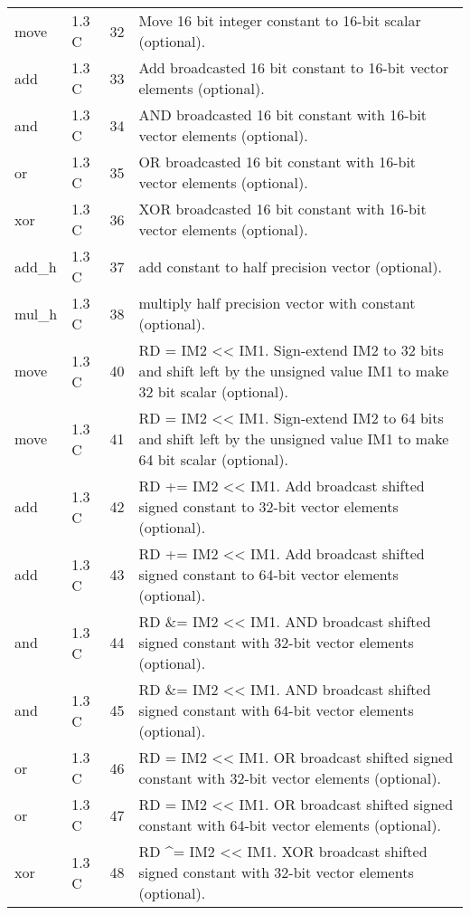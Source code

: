 \documentclass[forwardcom.tex]{subfiles}
\begin{document}
\begin{longtable} {|p{25mm}|p{12mm}|p{12mm}|p{95mm}|}
move          & 1.3 C & 32 & Move 16 bit integer constant to 16-bit scalar (optional). \\
add           & 1.3 C & 33 & Add broadcasted 16 bit constant to 16-bit vector elements (optional). \\
and           & 1.3 C & 34 & AND broadcasted 16 bit constant with 16-bit vector elements (optional). \\
or            & 1.3 C & 35 & OR broadcasted 16 bit constant with 16-bit vector elements (optional). \\
xor           & 1.3 C & 36 & XOR broadcasted 16 bit constant with 16-bit vector elements (optional). \\
add\_h        & 1.3 C & 37 & add constant to half precision vector (optional). \\
mul\_h        & 1.3 C & 38 & multiply half precision vector with constant (optional). \\
move          & 1.3 C & 40 & RD = IM2 \textless\textless{} IM1. Sign-extend IM2 to 32 bits and shift left by the unsigned value IM1 to make 32 bit scalar (optional). \\
move          & 1.3 C & 41 & RD = IM2 \textless\textless{} IM1. Sign-extend IM2 to 64 bits and shift left by the unsigned value IM1 to make 64 bit scalar (optional). \\
add           & 1.3 C & 42 & RD += IM2 \textless\textless{} IM1. Add broadcast shifted signed constant to 32-bit vector elements (optional). \\
add           & 1.3 C & 43 & RD += IM2 \textless\textless{} IM1. Add broadcast shifted signed constant to 64-bit vector elements (optional). \\
and           & 1.3 C & 44 & RD \&= IM2 \textless\textless{} IM1. AND broadcast shifted signed constant with 32-bit vector elements (optional). \\
and           & 1.3 C & 45 & RD \&= IM2 \textless\textless{} IM1. AND broadcast shifted signed constant with 64-bit vector elements (optional). \\
or            & 1.3 C & 46 & RD \textbar{}= IM2 \textless\textless{} IM1. OR broadcast shifted signed constant with 32-bit vector elements (optional). \\
or            & 1.3 C & 47 & RD \textbar{}= IM2 \textless\textless{} IM1. OR broadcast shifted signed constant with 64-bit vector elements (optional). \\
xor           & 1.3 C & 48 & RD \^{}= IM2 \textless\textless{} IM1. XOR broadcast shifted signed constant with 32-bit vector elements (optional). \\

\end{longtable}
\end{document}
